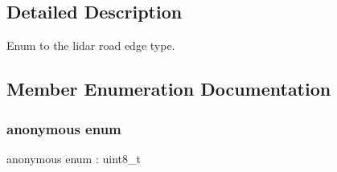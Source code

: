 \subsection{Detailed Description}
Enum to the lidar road edge type. 

\subsection{Member Enumeration Documentation}
\mbox{\label{structmaf__perception__interface_1_1LidarRoadEdgeTypeEnum_aefb7d94ea98d12492d4672cc39778dea}} 
\subsubsection{\texorpdfstring{anonymous enum}{anonymous enum}}
{\footnotesize\ttfamily anonymous enum \+: uint8\+\_\+t}

